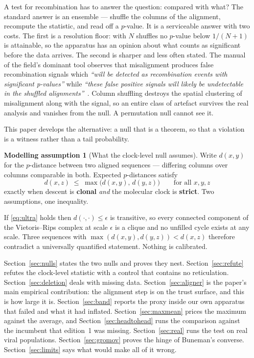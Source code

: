 \documentclass[11pt,a4paper]{article}
\theoremstyle{definition}
\newtheorem{model}[theorem]{Modelling assumption}
\theoremstyle{remark}
\begin{document}
A test for recombination has to answer the question: compared with what? The
standard answer is an ensemble --- shuffle the columns of the alignment, recompute
the statistic, and read off a $p$-value. It is a serviceable answer with two
costs. The first is a resolution floor: with $N$ shuffles no $p$-value below
$1/(N+1)$ is attainable, so the apparatus has an opinion about what counts as
significant before the data arrives. The second is sharper and less often
stated. The manual of the field's dominant tool observes that misalignment
produces false recombination signals which \emph{``will be detected as
recombination events with significant p-values''} while \emph{``these false
positive signals will likely be undetectable in the shuffled
alignments''}~\cite{rdp5}. Column shuffling destroys the spatial clustering of
misalignment along with the signal, so an entire class of artefact survives the
real analysis and vanishes from the null. A permutation null cannot see it.

This paper develops the alternative: a null that is a theorem, so that a
violation is a witness rather than a tail probability.

\begin{model}[What the clock-level null assumes]\label{mod:clock}
Write $d(x,y)$ for the $p$-distance between two aligned sequences --- differing
columns over columns comparable in both. Expected $p$-distances satisfy
\begin{equation}\label{eq:ultra}
  d(x,z) \;\le\; \max\!\big(d(x,y),\, d(y,z)\big) \qquad \text{for all } x,y,z
\end{equation}
exactly when descent is \textbf{clonal} \emph{and} the molecular clock is
\textbf{strict}. Two assumptions, one inequality.
\end{model}

If \eqref{eq:ultra} holds then $d(\cdot,\cdot) \le \epsilon$ is transitive, so
every connected component of the Vietoris--Rips complex at scale $\epsilon$ is a
clique and no unfilled cycle exists at any scale. Three sequences with
$\max(d(x,y), d(y,z)) < d(x,z)$ therefore contradict a universally quantified
statement. Nothing is calibrated.

Section~\ref{sec:nulls} states the two nulls and proves they nest.
Section~\ref{sec:refute} refutes the clock-level statistic with a control that
contains no reticulation. Section~\ref{sec:deletion} deals with missing data.
Section~\ref{sec:aligner} is the paper's main empirical contribution: the
alignment step is on the trust surface, and this is how large it is.
Section~\ref{sec:band} reports the proxy inside our own apparatus that failed and
what it had inflated. Section~\ref{sec:maxmean} prices the maximum against the
average, and Section~\ref{sec:headtohead} runs the comparison against the
incumbent that edition~1 was missing. Section~\ref{sec:real} runs the test on
real viral populations.
Section~\ref{sec:gromov} proves the hinge of Buneman's converse.
Section~\ref{sec:limits} says what would make all of it wrong.
\end{document}
